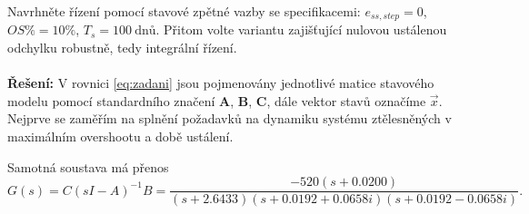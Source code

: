 \documentclass[twoside]{article}
\begin{document}
Navrhněte řízení pomocí stavové zpětné vazby se specifikacemi: $e_{ss,step} = 0$, $OS\% = 10\%$, $T_s = 100~\text{dnů}$.
Přitom volte variantu zajišťující nulovou ustálenou odchylku robustně, tedy integrální řízení. \\
\\
\textbf{Řešení:}
V rovnici \eqref{eq:zadani} jsou pojmenovány jednotlivé matice stavového modelu pomocí standardního značení $\mathbf{A}$, $\mathbf{B}$, $\mathbf{C}$,
dále vektor stavů označíme $\vec{x}$. Nejprve se zaměřím na splnění požadavků na dynamiku systému ztělesněných v maximálním overshootu a době ustálení.

Samotná soustava má přenos
\begin{equation}
	G(s) = C (sI - A)^{-1} B =  \frac{-520(s+0.0200)}{(s+2.6433)(s+0.0192+0.0658i)(s+0.0192-0.0658i)}.
\end{equation}
\end{document}
